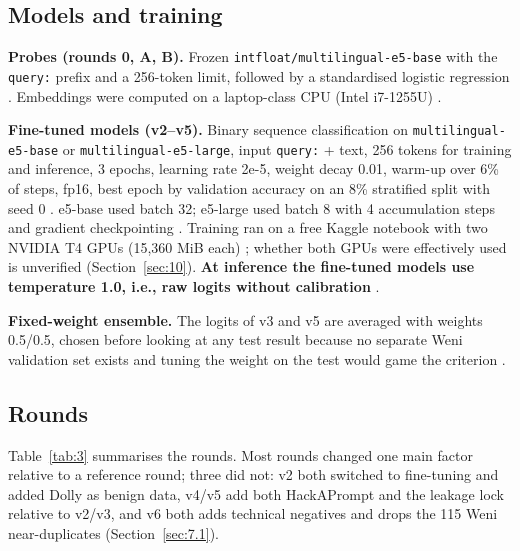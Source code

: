 \documentclass[11pt]{article}
\newcommand{\code}[1]{\texttt{#1}}
\begin{document}
\subsection{Models and training}\label{sec:3.5}

\textbf{Probes (rounds 0, A, B).} Frozen \code{intfloat/\allowbreak{}multilingual-\allowbreak{}e5-\allowbreak{}base} \citep{wang2024multilinguale5, intfloat2023me5large} with the \code{query:\textvisiblespace{}} prefix and a 256-token limit, followed by a standardised logistic regression%
. Embeddings were computed on a laptop-class CPU (Intel i7-1255U)%
.

\textbf{Fine-tuned models (v2–v5).} Binary sequence classification on \code{multilingual-\allowbreak{}e5-\allowbreak{}base} or \code{multilingual-\allowbreak{}e5-\allowbreak{}large}, input \code{query:\textvisiblespace{}} + text, 256 tokens for training and inference, 3 epochs, learning rate 2e-5, weight decay 0.01, warm-up over 6\% of steps, fp16, best epoch by validation accuracy on an 8\% stratified split with seed 0%
. e5-base used batch 32; e5-large used batch 8 with 4 accumulation steps and gradient checkpointing%
. Training ran on a free Kaggle notebook with two NVIDIA T4 GPUs (15,360 MiB each)%
; whether both GPUs were effectively used is unverified (Section~\ref{sec:10}). \textbf{At inference the fine-tuned models use temperature 1.0, i.e., raw logits without calibration}%
.

\textbf{Fixed-weight ensemble.} The logits of v3 and v5 are averaged with weights 0.5/0.5, chosen before looking at any test result because no separate Weni validation set exists and tuning the weight on the test would game the criterion%
.

\subsection{Rounds}\label{sec:3.6}

Table~\ref{tab:3} summarises the rounds. Most rounds changed one main factor relative to a reference round; three did not: v2 both switched to fine-tuning and added Dolly as benign data, v4/v5 add both HackAPrompt and the leakage lock relative to v2/v3, and v6 both adds technical negatives and drops the 115 Weni near-duplicates (Section~\ref{sec:7.1}).
\end{document}
